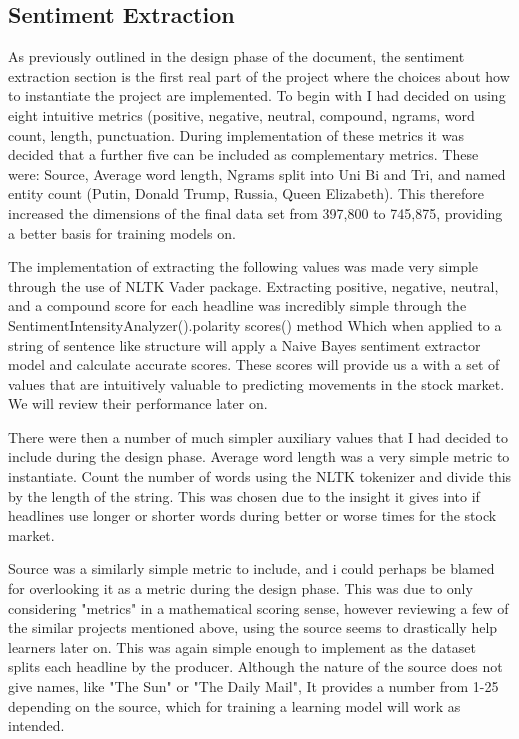 \documentclass[11pt, a4paper]{article}
\begin{document}
\subsection{Sentiment Extraction}
As previously outlined in the design phase of the document, the sentiment extraction section is the first real part of the project where the choices about how to instantiate the project are implemented. To begin with I had decided on using eight intuitive metrics (positive, negative, neutral, compound, ngrams, word count, length, punctuation. During implementation of these metrics it was decided that a further five can be included as complementary metrics. These were: Source, Average word length, Ngrams split into Uni Bi and Tri, and named entity count (Putin, Donald Trump, Russia, Queen Elizabeth). This therefore increased the dimensions of the final data set from 397,800 to 745,875, providing a better basis for training models on.

The implementation of extracting the following values was made very simple through the use of NLTK Vader package. Extracting positive, negative, neutral, and a compound score for each headline was incredibly simple through the 
SentimentIntensityAnalyzer().polarity scores() method
Which when applied to a string of sentence like structure will apply a Naive Bayes sentiment extractor model and calculate accurate scores. These scores will provide us a with a set of values that are intuitively valuable to predicting movements in the stock market. We will review their performance later on.

There were then a number of much simpler auxiliary values that I had decided to include during the design phase. Average word length was a very simple metric to instantiate. Count the number of words using the NLTK tokenizer and divide this by the length of the string. This was chosen due to the insight it gives into if headlines use longer or shorter words during better or worse times for the stock market.

Source was a similarly simple metric to include, and i could perhaps be blamed for overlooking it as a metric during the design phase. This was due to only considering "metrics" in a mathematical scoring sense, however reviewing a few of the similar projects mentioned above, using the source seems to drastically help learners later on. This was again simple enough to implement as the dataset splits each headline by the producer. Although the nature of the source does not give names, like "The Sun" or "The Daily Mail", It provides a number from 1-25 depending on the source, which for training a learning model will work as intended.    
\end{document}
